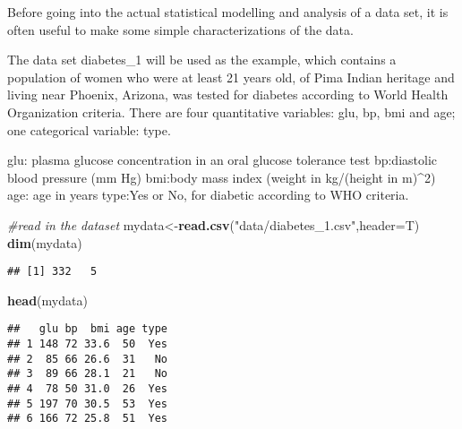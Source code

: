\documentclass[]{book}
\newenvironment{Shaded}{\begin{snugshade}}{\end{snugshade}}
\newcommand{\KeywordTok}[1]{\textcolor[rgb]{0.13,0.29,0.53}{\textbf{#1}}}
\newcommand{\DataTypeTok}[1]{\textcolor[rgb]{0.13,0.29,0.53}{#1}}
\newcommand{\StringTok}[1]{\textcolor[rgb]{0.31,0.60,0.02}{#1}}
\newcommand{\CommentTok}[1]{\textcolor[rgb]{0.56,0.35,0.01}{\textit{#1}}}
\newcommand{\NormalTok}[1]{#1}
\theoremstyle{definition}
\theoremstyle{definition}
\theoremstyle{definition}
\theoremstyle{remark}
\begin{document}
Before going into the actual statistical modelling and analysis of a
data set, it is often useful to make some simple characterizations of
the data.

The data set diabetes\_1 will be used as the example, which contains a
population of women who were at least 21 years old, of Pima Indian
heritage and living near Phoenix, Arizona, was tested for diabetes
according to World Health Organization criteria. There are four
quantitative variables: glu, bp, bmi and age; one categorical variable:
type.

glu: plasma glucose concentration in an oral glucose tolerance test
bp:diastolic blood pressure (mm Hg) bmi:body mass index (weight in
kg/(height in m)\^{}2) age: age in years type:Yes or No, for diabetic
according to WHO criteria.

\begin{Shaded}
\begin{Highlighting}[]
\CommentTok{#read in the dataset}
\NormalTok{mydata<-}\KeywordTok{read.csv}\NormalTok{(}\StringTok{"data/diabetes_1.csv"}\NormalTok{,}\DataTypeTok{header=}\NormalTok{T)}
\KeywordTok{dim}\NormalTok{(mydata)}
\end{Highlighting}
\end{Shaded}

\begin{verbatim}
## [1] 332   5
\end{verbatim}

\begin{Shaded}
\begin{Highlighting}[]
\KeywordTok{head}\NormalTok{(mydata)}
\end{Highlighting}
\end{Shaded}

\begin{verbatim}
##   glu bp  bmi age type
## 1 148 72 33.6  50  Yes
## 2  85 66 26.6  31   No
## 3  89 66 28.1  21   No
## 4  78 50 31.0  26  Yes
## 5 197 70 30.5  53  Yes
## 6 166 72 25.8  51  Yes
\end{verbatim}
\end{document}
